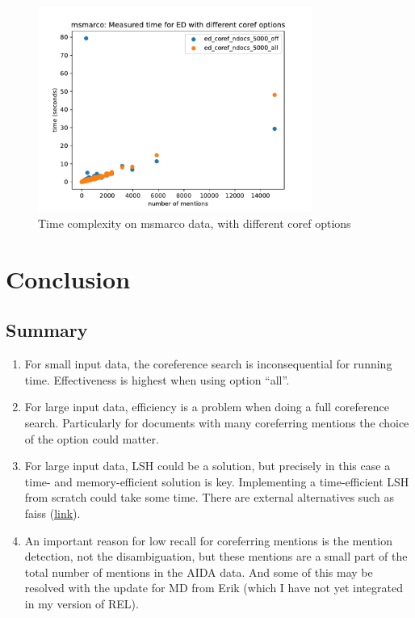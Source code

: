 \documentclass[a4paper,11pt]{article}
\numberwithin{equation}{section} %
\begin{document}
\begin{figure}
  \centering
  \includegraphics[width = 0.8\textwidth]{../figs/timing_msmarco.pdf}
  \caption{Time complexity on msmarco data, with different coref options}
  \label{fig:timing_msmarco}
\end{figure}




\section{Conclusion}

\subsection{Summary}
\begin{enumerate}
 \item For small input data, the coreference search is inconsequential for running time. Effectiveness is highest when using option ``all''.
 \item For large input data, efficiency is a problem when doing a full coreference search. Particularly for documents with many coreferring mentions the choice of the option could matter.
 \item For large input data, LSH could be a solution, but precisely in this case a time- and memory-efficient solution is key. Implementing a time-efficient LSH from scratch could take some time. There are external alternatives such as faiss (\href{https://github.com/facebookresearch/faiss}{\underline{link}}).
 \item An important reason for low recall for coreferring mentions is the mention detection, not the disambiguation, but these mentions are a small part of the total number of mentions in the AIDA data. And some of this may be resolved with the update for MD from Erik (which I have not yet integrated in my version of REL).
\end{enumerate}
\end{document}
